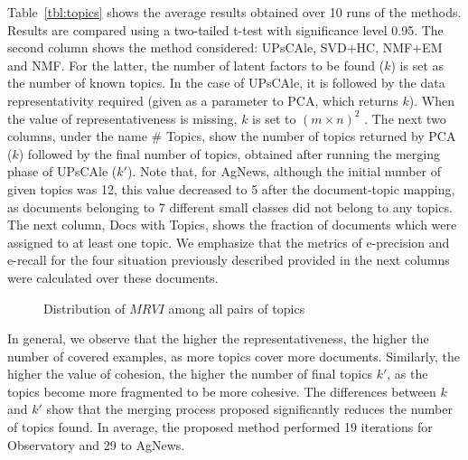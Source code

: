 Table~\ref{tbl:topics} shows the average results obtained over 10 runs of the methods. Results are compared using a two-tailed t-test with significance level 0.95. The second column shows the method considered: UPsCAle, SVD+HC, NMF+EM and NMF. For the latter, the number of latent factors to be found ($k$) is set as the number of known topics. In the case of UPsCAle, it is followed by the data representativity required (given as a parameter to PCA, which returns $k$). When the value of representativeness is missing, $k$ is set to $(m \times n)^2$ \cite{kuhn2007semantic}. The next two columns, under the name \# Topics, show the number of topics returned by PCA ($k$) followed by the final number of topics, obtained after running the merging phase of UPsCAle ($k'$). Note that, for AgNews, although the initial number of given topics was 12, this value decreased to 5 after the document-topic mapping, as documents belonging to 7 different small classes did not belong to any topics. The next column, Docs with Topics, shows the fraction of documents which were assigned to at least one topic. We emphasize that the metrics of e-precision and e-recall for the four situation previously described provided in the next columns were calculated over these documents.

\begin{figure}[!tb]
 \centering
 \caption{Distribution of $MRVI$ among all pairs of topics}
 \label{fig:mrvi}
 \end{figure}

In general, we observe that the higher the representativeness, the higher the number of covered examples, as more topics cover more documents. Similarly, the higher the value of cohesion, the higher the number of final topics $k'$, as the topics become more fragmented to be more cohesive. The differences between $k$ and $k'$ show that the merging process proposed significantly reduces the number of topics found.
In average, the proposed method performed 19 iterations for Observatory and 29 to AgNews.


